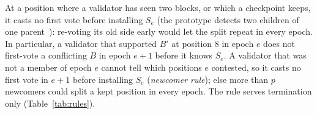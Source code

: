 At a position where a validator has seen two blocks, or which a checkpoint keeps, it casts no first vote before installing $S_e$ (the prototype detects two children of one parent~\cite{extended}): re-voting its old side early would let the split repeat in every epoch. In particular, a validator that supported $B'$ at position 8 in epoch $e$ does not first-vote a conflicting $B$ in epoch $e+1$ before it knows $S_e$. A validator that was not a member of epoch $e$ cannot tell which positions $e$ contested, so it casts no first vote in $e+1$ before installing $S_e$ (\emph{newcomer rule}); else more than $p$ newcomers could split a kept position in every epoch. The rule serves termination only (Table~\ref{tab:rules}).

